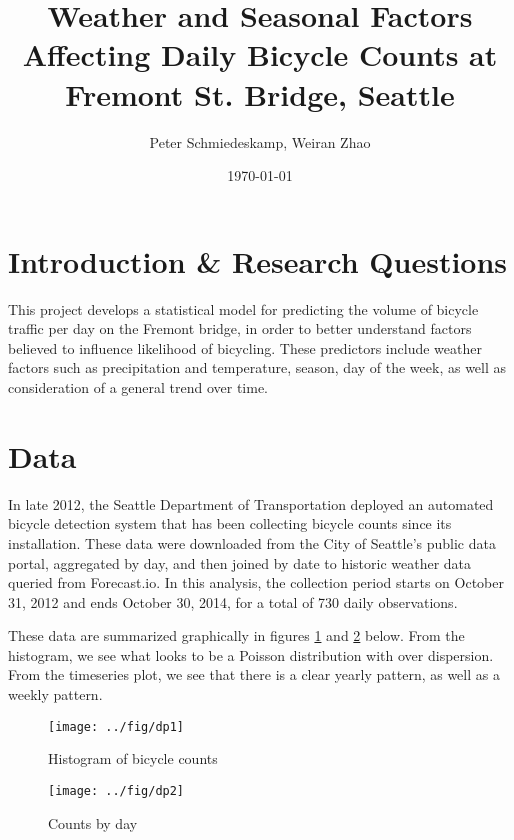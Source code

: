 \documentclass[final]{beamer}
\title
[CSSS 501 MLE Poster Session, 17 November 2014 -- http://github.com/pschmied/bikecounts-mle] %
{ %
Weather and Seasonal Factors Affecting Daily Bicycle Counts at Fremont St. Bridge, Seattle
}
\author{ %
Peter Schmiedeskamp\inst{1}, Weiran Zhao\inst{1}
}
\institute
[University of Washington] %
{
\inst{1} University of Washington, Seattle
}
\date{\today}
\begin{document}
\begin{frame}[t]
\begin{multicols}{3}

\section{Introduction \& Research Questions}
This project develops a statistical model for predicting the volume of
bicycle traffic per day on the Fremont bridge, in order to better
understand factors believed to influence likelihood of bicycling.
These predictors include weather factors such as precipitation and
temperature, season, day of the week, as well as consideration of a
general trend over time.

\section{Data}
In late 2012, the Seattle Department of Transportation deployed an
automated bicycle detection system that has been collecting bicycle
counts since its installation. These data were downloaded from the
City of Seattle's public data portal, aggregated by day, and then
joined by date to historic weather data queried from Forecast.io. In
this analysis, the collection period starts on October 31, 2012 and
ends October 30, 2014, for a total of 730 daily observations.

These data are summarized graphically in figures \ref{fg:hist} and
\ref{fg:timeseries} below. From the histogram, we see what looks to be
a Poisson distribution with over dispersion. From the timeseries plot,
we see that there is a clear yearly pattern, as well as a weekly
pattern.

\begin{figure}[htbp]
\begin{center}
\texttt{[image: ../fig/dp1]}
\caption{Histogram of bicycle counts}
\label{fg:hist}
\end{center}
\end{figure}

\begin{figure}[htbp]
\begin{center}
\texttt{[image: ../fig/dp2]}
\caption{Counts by day}
\label{fg:timeseries}
\end{center}
\end{figure}



\end{multicols}
\end{frame}
\end{document}
